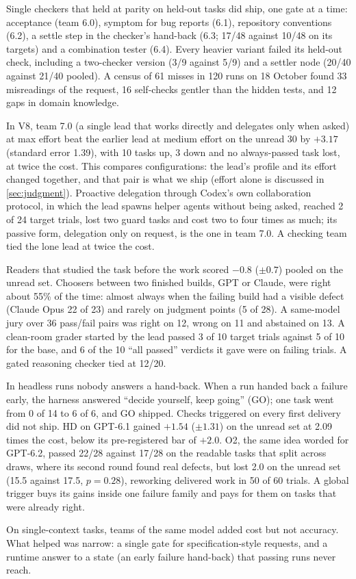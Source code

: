  Single checkers that held at parity on held-out tasks did ship, one gate at
a time: acceptance (team 6.0), symptom for bug reports (6.1), repository conventions (6.2), a
settle step in the checker's hand-back (6.3; 17/48 against 10/48 on its targets) and a combination
tester (6.4). Every heavier variant failed its held-out check, including a two-checker version
(3/9 against 5/9) and a settler node (20/40 against 21/40 pooled). A census of 61 misses in 120
runs on 18 October found 33 misreadings of the request, 16 self-checks gentler than the hidden
tests, and 12 gaps in domain knowledge.

 In V8, team 7.0 (a single lead that works directly
and delegates only when asked) at max effort beat the earlier lead at medium effort on the unread
30 by $+3.17$ (standard error 1.39), with 10 tasks up, 3 down and no always-passed task lost, at
twice the cost. This compares configurations: the lead's profile and its effort changed together,
and that pair is what we ship (effort alone is discussed in \cref{sec:judgment}). Proactive
delegation through Codex's own collaboration protocol, in which the lead spawns helper agents
without being asked, reached 2 of 24 target trials, lost two guard tasks and cost two to four
times as much; its passive form, delegation only on request, is the one in team 7.0. A checking
team tied the lone lead at twice the cost.

 Readers that studied the task before
the work scored $-0.8$ ($\pm 0.7$) pooled on the unread set. Choosers between two finished builds,
GPT or Claude, were right about 55\% of the time: almost always when the failing build had a
visible defect (Claude Opus 22 of 23) and rarely on judgment points (5 of 28). A same-model jury
over 36 pass/fail pairs was right on 12, wrong on 11 and abstained on 13. A
clean-room grader started by the lead passed 3 of 10 target trials against 5 of 10 for the base,
and 6 of the 10 ``all passed'' verdicts it gave were on failing trials. A gated reasoning checker
tied at 12/20.

 In headless runs nobody
answers a hand-back. When a run handed back a failure early, the harness answered ``decide
yourself, keep going'' (GO); one task went from 0 of 14 to 6 of 6, and GO shipped. Checks
triggered on every first delivery did not ship. HD on GPT-6.1 gained $+1.54$ ($\pm 1.31$) on the
unread set at 2.09 times the cost, below its pre-registered bar of $+2.0$. O2, the same idea worded
for GPT-6.2, passed 22/28 against 17/28 on the readable tasks that split across draws, where its
second round found real defects, but lost 2.0 on the unread set (15.5 against 17.5, $p = 0.28$),
reworking delivered work in 50 of 60 trials. A global trigger buys its gains inside one failure
family and pays for them on tasks that were already right.

 On single-context tasks, teams of the same model added cost but not accuracy.
What helped was narrow: a single gate for specification-style requests, and a runtime answer to a
state (an early failure hand-back) that passing runs never reach.
